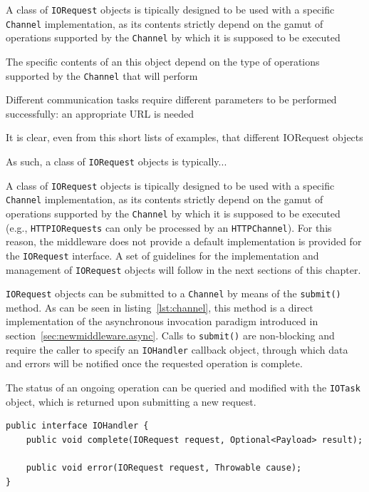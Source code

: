 A class of \texttt{IORequest} objects is tipically designed to be used with a specific \texttt{Channel} implementation, as its contents strictly depend on the gamut of operations supported by the \texttt{Channel} by which it is supposed to be executed 

The specific contents of an this object depend on the type of operations supported by the \texttt{Channel} that will perform

Different communication tasks require different parameters to be performed successfully: an appropriate URL is needed 

It is clear, even from this short lists of examples, that different IORequest objects

As such, a class of \texttt{IORequest} objects is typically...

 A class of \texttt{IORequest} objects is tipically designed to be used with a specific \texttt{Channel} implementation, as its contents strictly depend on the gamut of operations supported by the \texttt{Channel} by which it is supposed to be executed (e.g., \texttt{HTTPIORequests} can only be processed by an \texttt{HTTPChannel}). For this reason, the middleware does not provide a default implementation is provided for the \texttt{IORequest} interface. A set of guidelines for the implementation and management of \texttt{IORequest} objects will follow in the next sections of this chapter.

\texttt{IORequest} objects can be submitted to a \texttt{Channel} by means of the \texttt{submit()} method. As can be seen in listing~\ref{lst:channel}, this method is a direct implementation of the asynchronous invocation paradigm introduced in section~\ref{sec:newmiddleware.async}. Calls to \texttt{submit()} are non-blocking and require the caller to specify an \texttt{IOHandler} callback object, through which data and errors will be notified once the requested operation is complete.

The status of an ongoing operation can be queried and modified with the \texttt{IOTask} object, which is returned upon submitting a new request.


\lstset{language=Java}
\begin{lstlisting}[float,floatplacement=H,caption=The IOHandler interface,label={lst:iohandler}]
public interface IOHandler {
	public void complete(IORequest request, Optional<Payload> result);
	
	public void error(IORequest request, Throwable cause);
}
\end{lstlisting}

